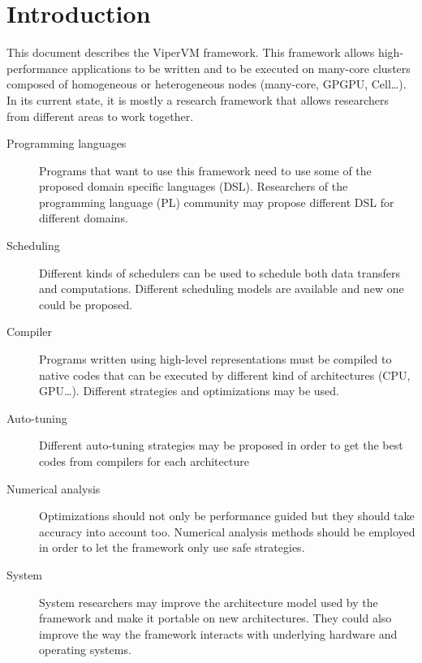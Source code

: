 \chapter{Introduction}

This document describes the ViperVM framework.  This framework allows
high-performance applications to be written and to be executed on many-core
clusters composed of homogeneous or heterogeneous nodes (many-core, GPGPU,
Cell\ldots).  In its current state, it is mostly a research framework that
allows researchers from different areas to work together.

\begin{description}
  \item[Programming languages] Programs that want to use this framework need to
  use some of the proposed domain specific languages (DSL).  Researchers of the
  programming language (PL) community may propose different DSL for different
  domains.

  \item[Scheduling] Different kinds of schedulers can be used to schedule both
  data transfers and computations.  Different scheduling models are available
  and new one could be proposed.

  \item[Compiler] Programs written using high-level representations must be
  compiled to native codes that can be executed by different kind of
  architectures (CPU, GPU\ldots).  Different strategies and optimizations may be
  used.

  \item[Auto-tuning] Different auto-tuning strategies may be proposed in order
  to get the best codes from compilers for each architecture

  \item[Numerical analysis] Optimizations should not only be performance guided
  but they should take accuracy into account too.  Numerical analysis methods
  should be employed in order to let the framework only use safe strategies.

  \item[System] System researchers may improve the architecture model used by
  the framework and make it portable on new architectures.  They could also
  improve the way the framework interacts with underlying hardware and operating
  systems.

\end{description}
